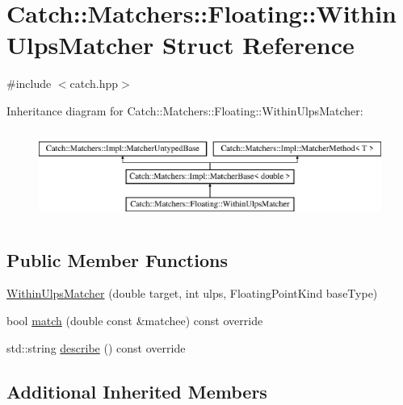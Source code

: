 \hypertarget{struct_catch_1_1_matchers_1_1_floating_1_1_within_ulps_matcher}{}\section{Catch\+:\+:Matchers\+:\+:Floating\+:\+:Within\+Ulps\+Matcher Struct Reference}
\label{struct_catch_1_1_matchers_1_1_floating_1_1_within_ulps_matcher}


{\ttfamily \#include $<$catch.\+hpp$>$}

Inheritance diagram for Catch\+:\+:Matchers\+:\+:Floating\+:\+:Within\+Ulps\+Matcher\+:\begin{figure}[H]
\begin{center}
\leavevmode
\includegraphics[height=2.968198cm]{struct_catch_1_1_matchers_1_1_floating_1_1_within_ulps_matcher}
\end{center}
\end{figure}
\subsection*{Public Member Functions}
\begin{DoxyCompactItemize}
\item 
\mbox{\hyperlink{struct_catch_1_1_matchers_1_1_floating_1_1_within_ulps_matcher_a836074ae4010275284ab66b2485c6575}{Within\+Ulps\+Matcher}} (double target, int ulps, Floating\+Point\+Kind base\+Type)
\item 
bool \mbox{\hyperlink{struct_catch_1_1_matchers_1_1_floating_1_1_within_ulps_matcher_aabda42a0dc5d00f3c5916feb75006b32}{match}} (double const \&matchee) const override
\item 
std\+::string \mbox{\hyperlink{struct_catch_1_1_matchers_1_1_floating_1_1_within_ulps_matcher_ad9bc8bb7f3abd326580a4bf6cf369b1b}{describe}} () const override
\end{DoxyCompactItemize}
\subsection*{Additional Inherited Members}


